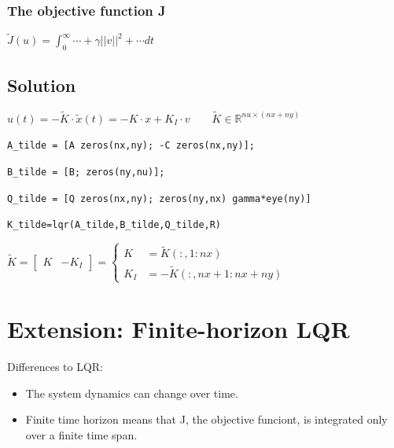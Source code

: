 \documentclass[10pt,a4paper]{scrartcl}
\begin{document}
\begin{multicols*}{3}
	\subsubsection{The objective function J}
	
	$\tilde{J}(u)=\int_0^\infty{\cdots+\gamma||v||^2+\cdots dt}$
	
	\columnbreak
	
	\subsection*{Solution}
	
	$u(t)=-\tilde{K}\cdot\tilde{x}(t)=-K\cdot x+K_I\cdot v\qquad \tilde{K}\in\mathbb{R}^{nu\times (nx+ny)}$
	
	\small
	\verb+A_tilde = [A zeros(nx,ny); -C zeros(nx,ny)];+
	
	\verb+B_tilde = [B; zeros(ny,nu)];+
	
	\verb+Q_tilde = [Q zeros(nx,ny); zeros(ny,nx) gamma*eye(ny)]+
	
	\verb+K_tilde=lqr(A_tilde,B_tilde,Q_tilde,R)+
	\normalsize
	
	\finn	
	
	$\tilde{K}=\begin{bmatrix}K&-K_I\end{bmatrix}=\begin{cases}K&=\tilde{K}(:,1:nx)\\K_I&=-\tilde{K}(:,nx+1:nx+ny)\end{cases}$
	

	\section[Finite Horizon LQR]{Extension: Finite-horizon LQR}
	
	Differences to LQR:
	
	\begin{itemize}
	\compaq
	\item
	The system dynamics can change over time.
	\item
	Finite time horizon means that J, the objective funciont, is integrated only over a finite time span.
	\end{itemize}
	
	
	

\end{multicols*}
\end{document}
